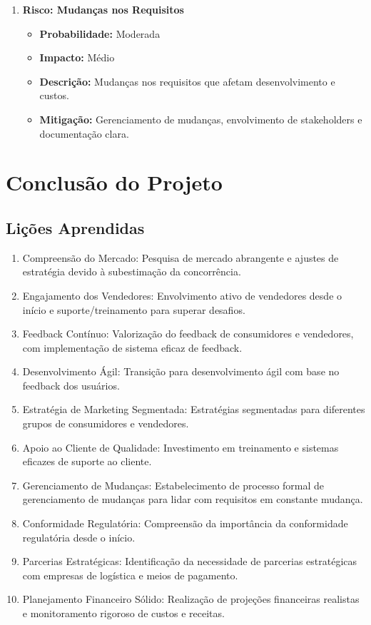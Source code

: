 \documentclass[
	12pt,				%
	openright,			%
	twoside,			%
	a4paper,			%
	english,			%
	brazil				%
	]{abntex2}
\begin{document}
\begin{enumerate}
    \item \textbf{Risco: Mudanças nos Requisitos}
    \begin{itemize}
        \item \textbf{Probabilidade:} Moderada
        \item \textbf{Impacto:} Médio
        \item \textbf{Descrição:} Mudanças nos requisitos que afetam desenvolvimento e custos.
        \item \textbf{Mitigação:} Gerenciamento de mudanças, envolvimento de stakeholders e documentação clara.
    \end{itemize}
\end{enumerate}

\part{Conclusão do Projeto}

\chapter{Lições Aprendidas}\label{cap_conclusao_do_projeto}

\begin{enumerate}
    \item Compreensão do Mercado: Pesquisa de mercado abrangente e ajustes de estratégia devido à subestimação da concorrência.
    \item Engajamento dos Vendedores: Envolvimento ativo de vendedores desde o início e suporte/treinamento para superar desafios.
    \item Feedback Contínuo: Valorização do feedback de consumidores e vendedores, com implementação de sistema eficaz de feedback.
    \item Desenvolvimento Ágil: Transição para desenvolvimento ágil com base no feedback dos usuários.
    \item Estratégia de Marketing Segmentada: Estratégias segmentadas para diferentes grupos de consumidores e vendedores.
    \item Apoio ao Cliente de Qualidade: Investimento em treinamento e sistemas eficazes de suporte ao cliente.
    \item Gerenciamento de Mudanças: Estabelecimento de processo formal de gerenciamento de mudanças para lidar com requisitos em constante mudança.
    \item Conformidade Regulatória: Compreensão da importância da conformidade regulatória desde o início.
    \item Parcerias Estratégicas: Identificação da necessidade de parcerias estratégicas com empresas de logística e meios de pagamento.
    \item Planejamento Financeiro Sólido: Realização de projeções financeiras realistas e monitoramento rigoroso de custos e receitas.
\end{enumerate}
\end{document}
